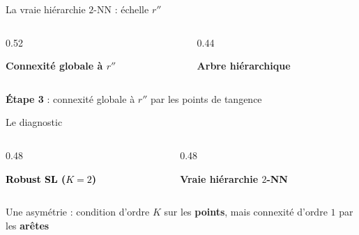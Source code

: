 \begin{frame}{La vraie hiérarchie $2$-NN : échelle $r''$}
    \begin{columns}[c, onlytextwidth]
        \begin{column}{0.52\textwidth}
            \begin{center}
                \textbf{Connexité globale à $r''$}

                \vspace{0.4cm}
                
            \end{center}
        \end{column}

        \begin{column}{0.44\textwidth}
            \begin{center}
                \textcolor{inria-rouge}{\textbf{Arbre hiérarchique}}

                \vspace{0.4cm}
                
            \end{center}
        \end{column}
    \end{columns}
    \vspace{0.3cm}
    \begin{center}
        \small \textbf{Étape 3} : connexité globale à $r''$ par les points de tangence
    \end{center}
\end{frame}

\begin{frame}{Le diagnostic}
    \begin{columns}[c, onlytextwidth]
        \begin{column}{0.48\textwidth}
            \begin{center}
                \textcolor{black}{\textbf{Robust SL ($K=2$)}}

                \vspace{0.4cm}
                
            \end{center}
        \end{column}

        \begin{column}{0.48\textwidth}
            \begin{center}
                \textcolor{inria-rouge}{\textbf{Vraie hiérarchie $2$-NN}}

                \vspace{0.4cm}
                
            \end{center}
        \end{column}
    \end{columns}
    \vspace{0.25cm}
    \begin{center}
        \normalsize Une asymétrie : condition d'ordre $K$ sur les \textbf{points}, mais connexité d'ordre $1$ par les \textbf{arêtes}
    \end{center}
\end{frame}

